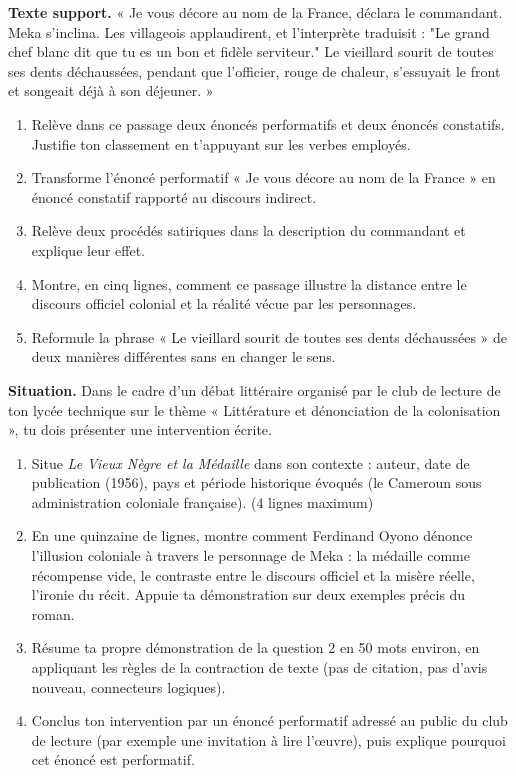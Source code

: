 \documentclass[11pt]{article}
\begin{document}
\begin{exercice}
\textbf{Texte support.} « Je vous décore au nom de la France, déclara le commandant. Meka s'inclina. Les villageois applaudirent, et l'interprète traduisit : "Le grand chef blanc dit que tu es un bon et fidèle serviteur." Le vieillard sourit de toutes ses dents déchaussées, pendant que l'officier, rouge de chaleur, s'essuyait le front et songeait déjà à son déjeuner. »
\begin{enumerate}
\item Relève dans ce passage deux énoncés performatifs et deux énoncés constatifs. Justifie ton classement en t'appuyant sur les verbes employés.
\item Transforme l'énoncé performatif « Je vous décore au nom de la France » en énoncé constatif rapporté au discours indirect.
\item Relève deux procédés satiriques dans la description du commandant et explique leur effet.
\item Montre, en cinq lignes, comment ce passage illustre la distance entre le discours officiel colonial et la réalité vécue par les personnages.
\item Reformule la phrase « Le vieillard sourit de toutes ses dents déchaussées » de deux manières différentes sans en changer le sens.
\end{enumerate}
\end{exercice}

\begin{exercice}
\textbf{Situation.} Dans le cadre d'un débat littéraire organisé par le club de lecture de ton lycée technique sur le thème « Littérature et dénonciation de la colonisation », tu dois présenter une intervention écrite.
\begin{enumerate}
\item Situe \emph{Le Vieux Nègre et la Médaille} dans son contexte : auteur, date de publication (1956), pays et période historique évoqués (le Cameroun sous administration coloniale française). (4 lignes maximum)
\item En une quinzaine de lignes, montre comment Ferdinand Oyono dénonce l'illusion coloniale à travers le personnage de Meka : la médaille comme récompense vide, le contraste entre le discours officiel et la misère réelle, l'ironie du récit. Appuie ta démonstration sur deux exemples précis du roman.
\item Résume ta propre démonstration de la question 2 en 50 mots environ, en appliquant les règles de la contraction de texte (pas de citation, pas d'avis nouveau, connecteurs logiques).
\item Conclus ton intervention par un énoncé performatif adressé au public du club de lecture (par exemple une invitation à lire l'œuvre), puis explique pourquoi cet énoncé est performatif.
\end{enumerate}
\end{exercice}
\end{document}

